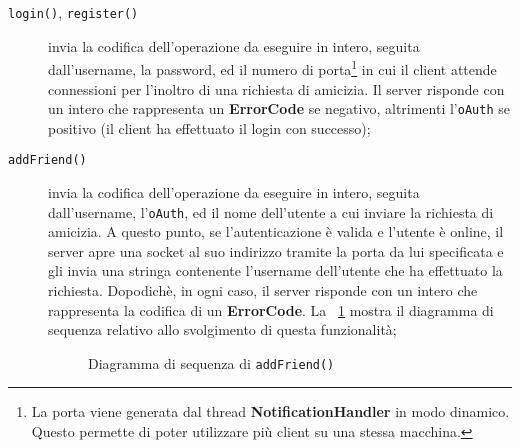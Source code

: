 \documentclass[11pt]{article}
\begin{document}
\begin{description}
	\item[{\tt login()}, {\tt register()}] invia la codifica dell'operazione da
	eseguire in intero, seguita dall'username, la password, ed il numero di
	porta\footnote{La porta viene generata dal thread {\bf NotificationHandler}
	in modo dinamico. Questo permette di poter utilizzare più client su una
	stessa macchina.} in cui il client attende connessioni per l'inoltro di una
	richiesta di amicizia. Il server risponde con un intero che rappresenta un
	{\bf ErrorCode} se negativo, altrimenti l'{\tt oAuth} se positivo (il client
	ha effettuato il login con successo);
	\item[{\tt addFriend()}] invia la codifica dell'operazione da eseguire in
	intero, seguita dall'username, l'{\tt oAuth}, ed il nome dell'utente a cui
	inviare la richiesta di amicizia. A questo punto, se l'autenticazione è
	valida e l'utente è online, il server apre una socket al suo indirizzo
	tramite la porta da lui specificata e gli invia una stringa contenente
	l'username dell'utente che ha effettuato la richiesta. Dopodichè, in ogni
	caso, il server risponde con un intero che rappresenta la codifica di un
	{\bf ErrorCode}. La \figurename~\ref{addfriend} mostra il diagramma di
	sequenza relativo allo svolgimento di questa funzionalità;

	\begin{figure}[h]
	\centering
	\caption{Diagramma di sequenza di {\tt addFriend()} \label{addfriend}}
	\end{figure}


\end{description}
\end{document}
